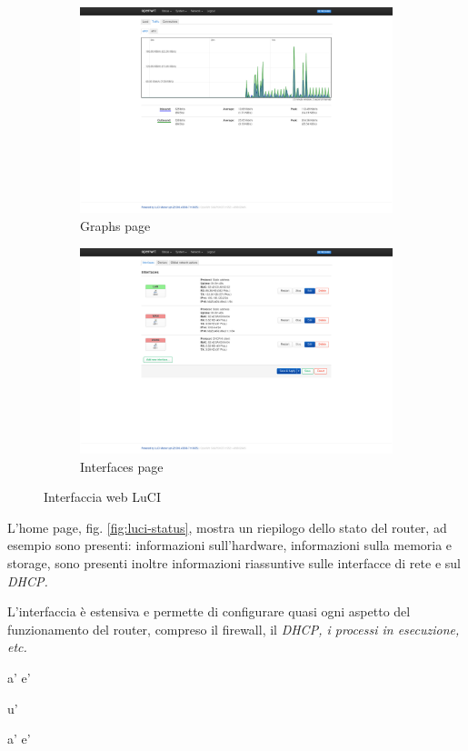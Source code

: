 \begin{figure}[H]
    \begin{subfigure}{0.5\linewidth}
        \centering
        \includegraphics[height=0.65\linewidth]{immagini/LuCI_graphs}
        \caption{Graphs page}
        \label{fig:luci-graphs}
    \end{subfigure}%
    \hfill
    \begin{subfigure}{0.5\linewidth}
        \centering
        \includegraphics[height=0.65\linewidth]{immagini/LuCI_interfaces}
        \caption{Interfaces page}
        \label{fig:luci-interfaces}
    \end{subfigure}%
    \caption{Interfaccia web LuCI}
\end{figure}


L'home page, fig. \ref{fig:luci-status}, mostra un riepilogo dello stato del router, ad esempio sono presenti: informazioni sull'hardware, informazioni sulla memoria e storage, sono presenti inoltre informazioni riassuntive sulle interfacce di rete e sul \it{DHCP}.

L'interfaccia è estensiva e permette di configurare quasi ogni aspetto del funzionamento del router, compreso il firewall, il \it{DHCP}, i processi in esecuzione, etc.




a'
e'

u'

a'
e'